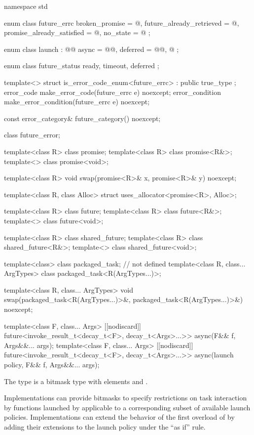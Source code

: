 %
%
\begin{codeblock}
namespace std {
  enum class future_errc {
    broken_promise = @\impdef@,
    future_already_retrieved = @\impdef@,
    promise_already_satisfied = @\impdef@,
    no_state = @\impdef@
  };

  enum class launch : @\unspec{}@ {
    async = @\unspec{}@,
    deferred = @\unspec{}@,
    @\impdef@
  };

  enum class future_status {
    ready,
    timeout,
    deferred
  };

  template<> struct is_error_code_enum<future_errc> : public true_type { };
  error_code make_error_code(future_errc e) noexcept;
  error_condition make_error_condition(future_errc e) noexcept;

  const error_category& future_category() noexcept;

  class future_error;

  template<class R> class promise;
  template<class R> class promise<R&>;
  template<> class promise<void>;

  template<class R>
    void swap(promise<R>& x, promise<R>& y) noexcept;

  template<class R, class Alloc>
    struct uses_allocator<promise<R>, Alloc>;

  template<class R> class future;
  template<class R> class future<R&>;
  template<> class future<void>;

  template<class R> class shared_future;
  template<class R> class shared_future<R&>;
  template<> class shared_future<void>;

  template<class> class packaged_task;   // not defined
  template<class R, class... ArgTypes>
    class packaged_task<R(ArgTypes...)>;

  template<class R, class... ArgTypes>
    void swap(packaged_task<R(ArgTypes...)>&, packaged_task<R(ArgTypes...)>&) noexcept;

  template<class F, class... Args>
    [[nodiscard]] future<invoke_result_t<decay_t<F>, decay_t<Args>...>>
      async(F&& f, Args&&... args);
  template<class F, class... Args>
    [[nodiscard]] future<invoke_result_t<decay_t<F>, decay_t<Args>...>>
      async(launch policy, F&& f, Args&&... args);
}
\end{codeblock}

\pnum
The  type  is a bitmask type with
elements  and .
\begin{note} Implementations can provide bitmasks to specify restrictions on task
interaction by functions launched by  applicable to a
corresponding subset of available launch policies. Implementations can extend
the behavior of the first overload of  by adding their extensions
to the launch policy under the ``as if'' rule. \end{note}

